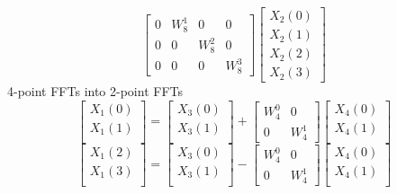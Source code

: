 \documentclass[journal,12pt,twocolumn]{IEEEtran}
\renewcommand\thesection{\arabic{section}}
\begin{document}
\begin{enumerate}[label=\thesection.\arabic*
	,ref=\thesection.\theenumi]
\begin{enumerate}[label=\arabic*.,ref=\thesection.\theenumi]
\begin{equation}
\begin{bmatrix}
			0 & W^{1}_{8} & 0 & 0\\
			0 & 0 & W^{2}_{8} & 0\\
			0 & 0 & 0 & W^{3}_{8}
		\end{bmatrix}
		\begin{bmatrix}
			X_{2}(0) \\ 
			X_{2}(1) \\ 
			X_{2}(2) \\
			X_{2}(3)
		\end{bmatrix}
	\end{equation}
	4-point FFTs into 2-point FFTs
	\begin{equation}
		\begin{bmatrix}
			X_{1}(0) \\ 
			X_{1}(1)\\ 
		\end{bmatrix}
		=
		\begin{bmatrix}
			X_{3}(0) \\ 
			X_{3}(1)\\ 
		\end{bmatrix}
		+
		\begin{bmatrix}
			W^{0}_{4} & 0\\
			0 & W^{1}_{4}
		\end{bmatrix}
		\begin{bmatrix}
			X_{4}(0) \\ 
			X_{4}(1) \\ 
		\end{bmatrix}
	\end{equation}
	\begin{equation}
		\begin{bmatrix}
			X_{1}(2) \\ 
			X_{1}(3)\\ 
		\end{bmatrix}
		=
		\begin{bmatrix}
			X_{3}(0) \\ 
			X_{3}(1)\\ 
		\end{bmatrix}
		-
		\begin{bmatrix}
			W^{0}_{4} & 0\\
			0 & W^{1}_{4}
		\end{bmatrix}
		\begin{bmatrix}
			X_{4}(0) \\ 
			X_{4}(1) \\ 
		\end{bmatrix}
	\end{equation}
	\begin{equation}

\end{equation}
\end{enumerate}
\end{enumerate}
\end{document}

